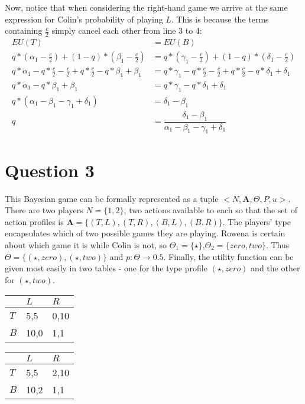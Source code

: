 \documentclass[10pt,a4paper]{article}
\begin{document}
Now, notice that when considering the right-hand game we arrive at the same expression for Colin's probability of playing $L$. This is because the terms containing $\tfrac{c}{2}$ simply cancel each other from line 3 to 4:
\begin{align}
EU(T)&=EU(B) \\
q*(\alpha_1-\tfrac{c}{2})+(1-q)*(\beta_1-\tfrac{c}{2})&=q*(\gamma_1-\tfrac{c}{2})+(1-q)*(\delta_1-\tfrac{c}{2}) \\
q*\alpha_1-q*\tfrac{c}{2}-\tfrac{c}{2}+q*\tfrac{c}{2}-q*\beta_1+\beta_1&=q*\gamma_1-q*\tfrac{c}{2}-\tfrac{c}{2}+q*\tfrac{c}{2}-q*\delta_1+\delta_1 \\
q*\alpha_1-q*\beta_1+\beta_1&=q*\gamma_1-q*\delta_1+\delta_1 \\
q*(\alpha_1-\beta_1-\gamma_1+\delta_1)&=\delta_1-\beta_1 \\
q &= \dfrac{\delta_1-\beta_1}{\alpha_1-\beta_1-\gamma_1+\delta_1}
\end{align}

\section*{Question 3}
This Bayesian game can be formally represented as a tuple $<N,\boldsymbol{A}, \Theta, P, u>$. There are two players $N=\{1,2\}$, two actions available to each so that the set of action profiles is $\boldsymbol{A}=\{(T,L),(T,R),(B,L),(B,R)\}$. The players' type encapsulates which of two possible games they are playing. Rowena is certain about which game it is while Colin is not, so $\Theta_1=\{\star\}$,$\Theta_2=\{zero,two\}$. Thus $\Theta=\{(\star,zero),(\star,two)\}$ and $p: \Theta \rightarrow 0.5$. Finally, the utility function can be given most easily in two tables - one for the type profile $(\star,zero)$ and the other for $(\star,two)$.
\begin{table}[h]
\centering
\begin{tabular}[l]{|l|l|l|}
\hline
          & $L$ & $R$  \\ \hline
$T$     & 5,5   & 0,10 \\ \hline
$B$		& 10,0	& 1,1 \\ \hline
\end{tabular}
\quad
\begin{tabular}[r]{|l|l|l|}
\hline
          & $L$ & $R$  \\ \hline
$T$     & 5,5   & 2,10 \\ \hline
$B$		& 10,2	& 1,1 \\ \hline
\end{tabular}
\end{table}
\end{document}
